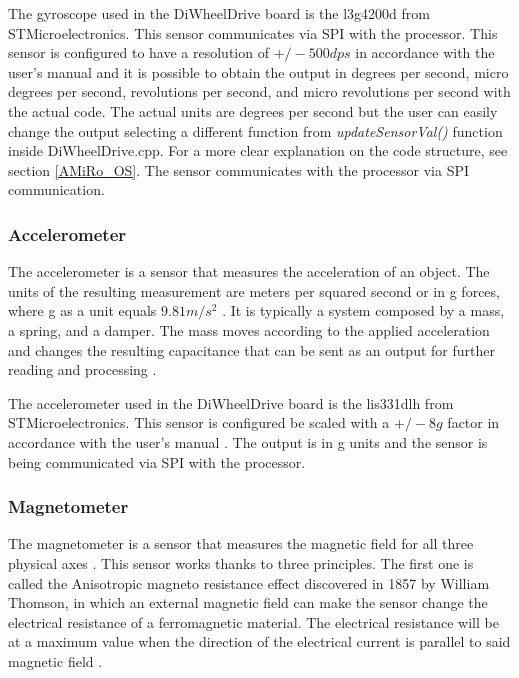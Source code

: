 \documentclass[12pt]{report}%
\begin{document}
The gyroscope used in the DiWheelDrive board is the l3g4200d from STMicroelectronics. This sensor communicates via SPI with the processor. This sensor is configured to have a resolution of $+/-500 dps$ in accordance with the user's manual \cite{gyroscopepart} and it is possible to obtain the output in degrees per second, micro degrees per second, revolutions per second, and micro revolutions per second with the actual code. The actual units are degrees per second but the user can easily change the output selecting a different function from \textit{updateSensorVal()} function inside DiWheelDrive.cpp. For a more clear explanation on the code structure, see section \ref{AMiRo_OS}. The sensor communicates with the processor via SPI communication.

\subsubsection{Accelerometer}
The accelerometer is a sensor that measures the acceleration of an object. The units of the resulting measurement are meters per squared second or in g forces, where g as a unit equals $9.81 m/s^2$ \cite{accelerometertheory}. It is typically a system composed by a mass, a spring, and a damper. The mass moves according to the applied acceleration and changes the resulting capacitance that can be sent as an output for further reading and processing \cite{AMiRo_ppt_v1}.

The accelerometer used in the DiWheelDrive board is the lis331dlh from STMicroelectronics. This sensor is configured be scaled with a $+/-8g$ factor in accordance with the user's manual \cite{accelerometerpart}. The output is in g units and the sensor is being communicated via SPI with the processor.

\subsubsection{Magnetometer}
The magnetometer is a sensor that measures the magnetic field for all three physical axes \cite{magnetometertheory}. This sensor works thanks to three principles. The first one is called the Anisotropic magneto resistance effect discovered in 1857 by William Thomson, in which an external magnetic field can make the sensor change the electrical resistance of a ferromagnetic material. The electrical resistance will be at a maximum value when the direction of the electrical current is parallel to said magnetic field \cite{AMiRo_ppt_v1}.
\end{document}
